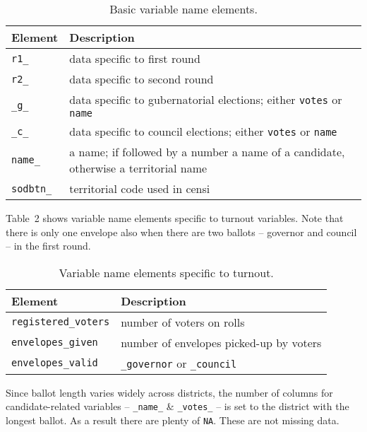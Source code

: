 \documentclass[11pt, a4paper]{article}
\begin{document}
\begin{table}[H]\footnotesize
	\label{tab:modules}
	\caption{Basic variable name elements.}
	\begin{center}
		\begin{tabular}{ll}
			\toprule
			Element	& Description \\		
			\midrule
			\texttt{r1\_}	&	data specific to first round \\
			\texttt{r2\_}	&	data specific to second round \\
			\texttt{\_g\_}	&	data specific to gubernatorial elections; either \texttt{votes} or \texttt{name} \\			
			\texttt{\_c\_}	&	data specific to council elections; either \texttt{votes} or \texttt{name} \\						
			\texttt{name\_}	&	a name; if followed by a number a name of a candidate, otherwise a territorial name \\
			\texttt{sodbtn\_}	&	territorial code used in censi \\
			\bottomrule
		\end{tabular}
	\end{center}
\end{table}

Table~2 shows variable name elements specific to turnout variables.
Note that there is only one envelope also when there are two ballots -- governor and council
-- in the first round.

\begin{table}[H]\footnotesize
	\label{tab:turn}
	\caption{Variable name elements specific to turnout.}
	\begin{center}
		\begin{tabular}{ll}
			\toprule
			Element	& Description \\		
			\midrule
			\texttt{registered\_voters}	&	number of voters on rolls \\
			\texttt{envelopes\_given}	&	number of envelopes picked-up by voters\\
			\texttt{envelopes\_valid}	&	\texttt{\_governor} or \texttt{\_council} \\			
			\bottomrule
		\end{tabular}
	\end{center}
\end{table}






Since ballot length varies widely across districts, the number of columns for candidate-related
variables -- \texttt{\_name\_} \& \texttt{\_votes\_} -- is set to the district with the longest ballot.
As a result there are plenty of \texttt{NA}. These are not missing data.
\end{document}
